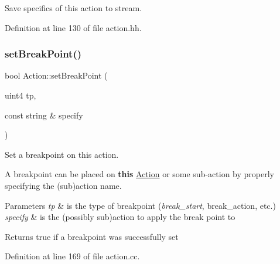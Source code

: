 Save specifics of this action to stream. 



Definition at line 130 of file action.\+hh.

\mbox{\label{class_action_a52b3b4ed8ffd52be1b2d6b64c81f26a4}} 
\subsubsection{\texorpdfstring{setBreakPoint()}{setBreakPoint()}}
{\footnotesize\ttfamily bool Action\+::set\+Break\+Point (\begin{DoxyParamCaption}\item[{uint4}]{tp,  }\item[{const string \&}]{specify }\end{DoxyParamCaption})}



Set a breakpoint on this action. 

A breakpoint can be placed on {\bfseries{this}} \mbox{\hyperlink{class_action}{Action}} or some sub-\/action by properly specifying the (sub)action name. 
\begin{DoxyParams}{Parameters}
{\em tp} & is the type of breakpoint ({\itshape break\+\_\+start}, break\+\_\+action, etc.) \\
\hline
{\em specify} & is the (possibly sub)action to apply the break point to \\
\hline
\end{DoxyParams}
\begin{DoxyReturn}{Returns}
true if a breakpoint was successfully set 
\end{DoxyReturn}


Definition at line 169 of file action.\+cc.

